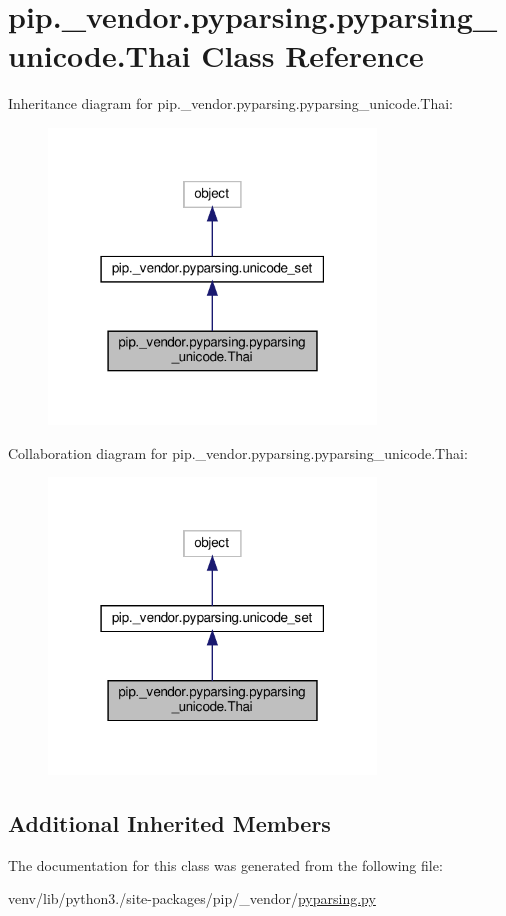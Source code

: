 \hypertarget{classpip_1_1__vendor_1_1pyparsing_1_1pyparsing__unicode_1_1Thai}{}\section{pip.\+\_\+vendor.\+pyparsing.\+pyparsing\+\_\+unicode.\+Thai Class Reference}
\label{classpip_1_1__vendor_1_1pyparsing_1_1pyparsing__unicode_1_1Thai}


Inheritance diagram for pip.\+\_\+vendor.\+pyparsing.\+pyparsing\+\_\+unicode.\+Thai\+:
\nopagebreak
\begin{figure}[H]
\begin{center}
\leavevmode
\includegraphics[width=247pt]{classpip_1_1__vendor_1_1pyparsing_1_1pyparsing__unicode_1_1Thai__inherit__graph}
\end{center}
\end{figure}


Collaboration diagram for pip.\+\_\+vendor.\+pyparsing.\+pyparsing\+\_\+unicode.\+Thai\+:
\nopagebreak
\begin{figure}[H]
\begin{center}
\leavevmode
\includegraphics[width=247pt]{classpip_1_1__vendor_1_1pyparsing_1_1pyparsing__unicode_1_1Thai__coll__graph}
\end{center}
\end{figure}
\subsection*{Additional Inherited Members}


The documentation for this class was generated from the following file\+:\begin{DoxyCompactItemize}
\item 
venv/lib/python3./site-\/packages/pip/\+\_\+vendor/\hyperlink{pip_2__vendor_2pyparsing_8py}{pyparsing.\+py}\end{DoxyCompactItemize}
